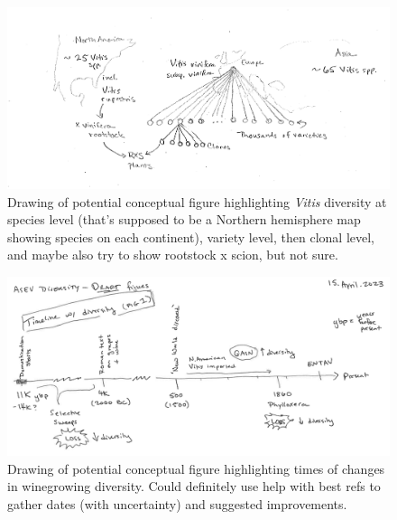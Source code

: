 \documentclass[11pt]{article}
\begin{document}
\begin{figure}[h!]
\centering
\noindent \includegraphics[width=1\textwidth]{figures/scan7May2023vitis.png}
\caption{Drawing of potential conceptual figure highlighting \emph{Vitis} diversity at species level (that's supposed to be a Northern hemisphere map showing species on each continent), variety level, then clonal level, and maybe also try to show rootstock x scion, but not sure.}
\label{fig:vitislevels}
\end{figure}

\newpage
\begin{figure}[h!]
\centering
\noindent \includegraphics[width=1\textwidth]{figures/scan21Apr2023_historyfig.png}
\caption{Drawing of potential conceptual figure highlighting times of changes in winegrowing diversity. Could definitely use help with best refs to gather dates (with uncertainty) and suggested improvements.}
\label{fig:history}
\end{figure}
\end{document}
